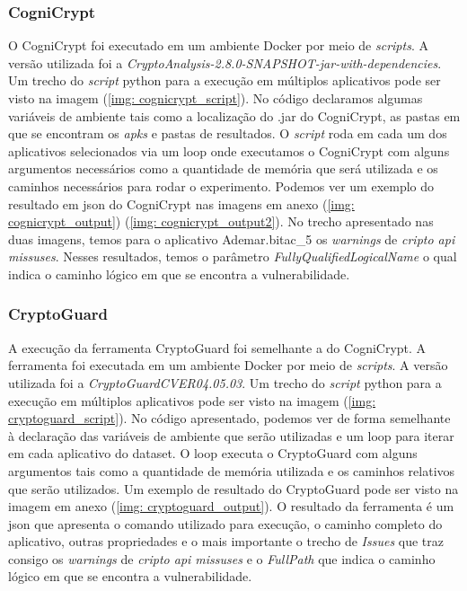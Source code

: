 \subsubsection{CogniCrypt}

O CogniCrypt foi executado em um ambiente Docker por meio de \textit{scripts}. A versão utilizada foi a \textit{CryptoAnalysis-2.8.0-SNAPSHOT-jar-with-dependencies}. Um trecho do \textit{script} python para a execução em múltiplos aplicativos pode ser visto na imagem (\ref{img: cognicrypt_script}). No código declaramos algumas variáveis de ambiente tais como a localização do .jar do CogniCrypt, as pastas em que se encontram os \textit{apks} e pastas de resultados. O \textit{script} roda em cada um dos aplicativos selecionados via um loop onde executamos o CogniCrypt com alguns argumentos necessários como a quantidade de memória que será utilizada e os caminhos necessários para rodar o experimento.
Podemos ver um exemplo do resultado em json do CogniCrypt nas imagens em anexo (\ref{img: cognicrypt_output}) (\ref{img: cognicrypt_output2}). No trecho apresentado nas duas imagens, temos para o aplicativo Ademar.bitac\_5 os \textit{warnings} de \textit{cripto api missuses}. Nesses resultados, temos o parâmetro \textit{FullyQualifiedLogicalName} o qual indica o caminho lógico em que se encontra a vulnerabilidade.

\subsubsection{CryptoGuard}

A execução da ferramenta CryptoGuard foi semelhante a do CogniCrypt. A ferramenta foi executada em um ambiente Docker por meio de \textit{scripts}. A versão utilizada foi a \textit{CryptoGuardCVER04.05.03}. Um trecho do \textit{script} python para a execução em múltiplos aplicativos pode ser visto na imagem (\ref{img: cryptoguard_script}). No código apresentado, podemos ver de forma semelhante à declaração das variáveis de ambiente que serão utilizadas e um loop para iterar em cada aplicativo do dataset. O loop executa o CryptoGuard com alguns argumentos tais como a quantidade de memória utilizada e os caminhos relativos que serão utilizados.
Um exemplo de resultado do CryptoGuard pode ser visto na imagem em anexo (\ref{img: cryptoguard_output}). O resultado da ferramenta é um json que apresenta o comando utilizado para execução, o caminho completo do aplicativo, outras propriedades e o mais importante o trecho de \textit{Issues} que traz consigo os \textit{warnings} de \textit{cripto api missuses} e o \textit{FullPath} que indica o caminho lógico em que se encontra a vulnerabilidade.

